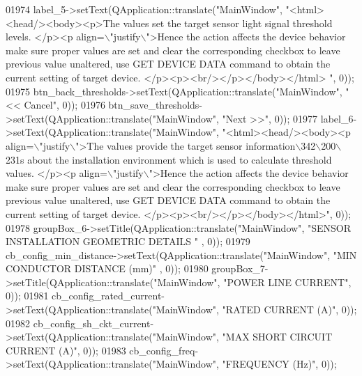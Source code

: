 \begin{DoxyCode}
01974         label\_5->setText(QApplication::translate(\textcolor{stringliteral}{"MainWindow"}, \textcolor{stringliteral}{"<html><head/><body><p>The values set the
       target sensor light signal threshold levels.  </p><p align=\(\backslash\)"justify\(\backslash\)">Hence the action affects the device
       behavior make sure proper values are set and clear the corresponding checkbox to leave previous value
       unaltered, use GET DEVICE DATA command to obtain the current setting of target device. </p><p><br/></p></body></html>
      "}, 0));
01975         btn\_back\_thresholds->setText(QApplication::translate(\textcolor{stringliteral}{"MainWindow"}, \textcolor{stringliteral}{"<< Cancel"}, 0));
01976         btn\_save\_thresholds->setText(QApplication::translate(\textcolor{stringliteral}{"MainWindow"}, \textcolor{stringliteral}{"Next >>"}, 0));
01977         label\_6->setText(QApplication::translate(\textcolor{stringliteral}{"MainWindow"}, \textcolor{stringliteral}{"<html><head/><body><p align=\(\backslash\)"justify\(\backslash\)">The
       values provide the target sensor information\(\backslash\)342\(\backslash\)200\(\backslash\)231s about the installation environment which is used
       to calculate threshold values. </p><p align=\(\backslash\)"justify\(\backslash\)">Hence the action affects the device behavior make
       sure proper values are set and clear the corresponding checkbox to leave previous value unaltered, use GET
       DEVICE DATA command to obtain the current setting of target device. </p><p><br/></p></body></html>"}, 0));
01978         groupBox\_6->setTitle(QApplication::translate(\textcolor{stringliteral}{"MainWindow"}, \textcolor{stringliteral}{"SENSOR INSTALLATION GEOMETRIC DETAILS "}
      , 0));
01979         cb\_config\_min\_distance->setText(QApplication::translate(\textcolor{stringliteral}{"MainWindow"}, \textcolor{stringliteral}{"MIN CONDUCTOR DISTANCE (mm)"}
      , 0));
01980         groupBox\_7->setTitle(QApplication::translate(\textcolor{stringliteral}{"MainWindow"}, \textcolor{stringliteral}{"POWER LINE CURRENT"}, 0));
01981         cb\_config\_rated\_current->setText(QApplication::translate(\textcolor{stringliteral}{"MainWindow"}, \textcolor{stringliteral}{"RATED CURRENT (A)"}, 0));
01982         cb\_config\_sh\_ckt\_current->setText(QApplication::translate(\textcolor{stringliteral}{"MainWindow"}, \textcolor{stringliteral}{"MAX SHORT CIRCUIT CURRENT
       (A)"}, 0));
01983         cb\_config\_freq->setText(QApplication::translate(\textcolor{stringliteral}{"MainWindow"}, \textcolor{stringliteral}{"FREQUENCY (Hz)"}, 0));

\end{DoxyCode}

